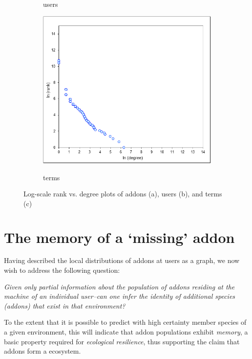 \documentclass[ijoc,nonblindrev]{informs3} %
\numberwithin{equation}{subsection}
\begin{document}
\begin{figure}[t]
\begin{subfigure}[b]{0.30\textwidth}
\caption{users} 
\label{fig:power_law_addons}
\end{subfigure}
\begin{subfigure}[b]{0.30\textwidth}
	\centering
\includegraphics[scale=0.30]{figures/zipf-terms.png} \\
\caption{terms}
\end{subfigure}
\caption{Log-scale rank vs. degree plots of addons (a), users (b), and terms (c)}
	\label{fig:zipf}
\end{figure}

\section{The memory of a `missing' addon}
\label{chap:user_ecosystem}


Having described the local distributions of addons at users as a graph, we now wish to address the following question:

{\it Given only partial information about the population of addons residing at the machine of an individual user--can one infer the identity of additional species (addons) that exist in that environment?}

To the extent that it is possible to predict with high certainty member species of a given environment, this will indicate that addon populations exhibit {\it memory}, a basic property required for {\it ecological resilience}, thus supporting the claim that addons form a ecosystem. 
\end{document}
